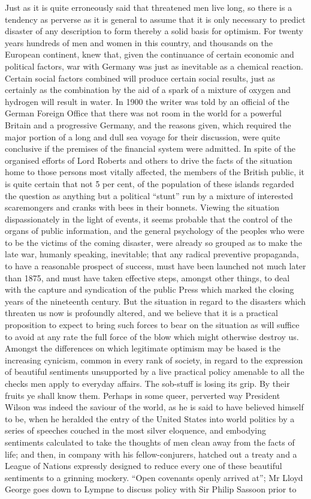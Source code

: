 \documentclass{book}
\begin{document}
Just as it is quite erroneously said that threatened men live long, so there is a tendency as perverse as it is general to assume that it is only necessary to predict disaster of any description to form thereby a solid basis for optimism. For twenty years hundreds of men and women in this country, and thousands on the European continent, knew that, given the continuance of certain economic and political factors, war with Germany was just as inevitable as a chemical reaction. Certain social factors combined will produce certain social results, just as certainly as the combination by the aid of a spark of a mixture of oxygen and hydrogen will result in water. In 1900 the writer was told by an official of the German Foreign Office that there was not room in the world for a powerful Britain and a progressive Germany, and the reasons given, which required the major portion of a long and dull sea voyage for their discussion, were quite conclusive if the premises of the financial system were admitted. In spite of the organised efforts of Lord Roberts and others to drive the facts of the situation home to those persons most vitally affected, the members of the British public, it is quite certain that not 5 per cent, of the population of these islands regarded the question as anything but a political “stunt” run by a mixture of interested scaremongers and cranks with bees in their bonnets. Viewing the situation dispassionately in the light of events, it seems probable that the control of the organs of public information, and the general psychology of the peoples who were to be the victims of the coming disaster, were already so grouped as to make the late war, humanly speaking, inevitable; that any radical preventive propaganda, to have a reasonable prospect of success, must have been launched not much later than 1875, and must have taken effective steps, amongst other things, to deal with the capture and syndication of the public Press which marked the closing years of the nineteenth century. But the situation in regard to the disasters which threaten us now is profoundly altered, and we believe that it is a practical proposition to expect to bring such forces to bear on the situation as will suffice to avoid at any rate the full force of the blow which might otherwise destroy us. Amongst the differences on which legitimate optimism may be based is the increasing cynicism, common in every rank of society, in regard to the expression of beautiful sentiments unsupported by a live practical policy amenable to all the checks men apply to everyday affairs. The sob-stuff is losing its grip. By their fruits ye shall know them. Perhaps in some queer, perverted way President Wilson was indeed the saviour of the world, as he is said to have believed himself to be, when he heralded the entry of the United States into world politics by a series of speeches couched in the most silver eloquence, and embodying sentiments calculated to take the thoughts of men clean away from the facts of life; and then, in company with his fellow-conjurers, hatched out a treaty and a League of Nations expressly designed to reduce every one of these beautiful sentiments to a grinning mockery. “Open covenants openly arrived at”; Mr Lloyd George goes down to Lympne to discuss policy with Sir Philip Sassoon prior to 
\end{document}
